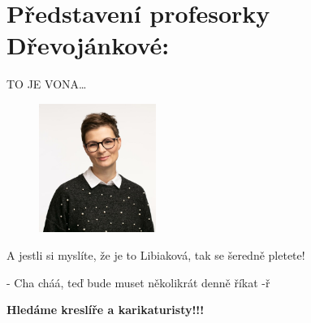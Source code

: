 \documentclass[twoside, 11pt]{article}
\begin{document}
\section*{Představení profesorky Dřevojánkové:}
TO JE VONA\dots \\
\begin{figure}
    \vspace*{-40pt}
    \includegraphics[width=0.34\textwidth]{libiak}
\end{figure}

A jestli si myslíte, že je to Libiaková, tak se šeredně pletete!
\vfill
\begin{flushright}
    - Cha cháá, teď bude muset několikrát denně říkat -ř  
\end{flushright}

\clearpage

\begin{center}
    \Large \textbf{Hledáme kreslíře a karikaturisty!!!}
\end{center}
\end{document}
